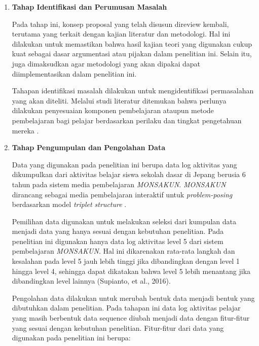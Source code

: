 \begin{enumerate}
    \item \textbf{Tahap Identifikasi dan Perumusan Masalah}

        \setlength{\parindent}{1cm}

        Pada tahap ini, konsep proposal yang telah disusun direview kembali, terutama yang terkait dengan kajian literatur dan metodologi. Hal ini dilakukan untuk memastikan bahwa hasil kajian teori yang digunakan cukup kuat sebagai dasar argumentasi atau pijakan dalam penelitian ini. Selain itu, juga dimaksudkan agar metodologi yang akan dipakai dapat diimplementasikan dalam penelitian ini.

        Tahapan identifikasi masalah dilakukan untuk mengidentifikasi permasalahan yang akan diteliti. Melalui studi literatur ditemukan bahwa perlunya dilakukan penyesuaian komponen pembelajaran ataupun metode pembelajaran bagi pelajar berdasarkan perilaku dan tingkat pengetahuan mereka \citep{Ahmad2015}. 

    \item \textbf{Tahap Pengumpulan dan Pengolahan Data}

        Data yang digunakan pada penelitian ini berupa data log aktivitas yang dikumpulkan dari aktivitas belajar siswa sekolah dasar di Jepang berusia 6 tahun pada sistem media pembelajaran \textit{MONSAKUN}. \textit{MONSAKUN} dirancang sebagai media pembelajaran interaktif untuk \textit{problem-posing} berdasarkan model \textit{triplet structure} \citep{Hirashima2014}. 

        Pemilihan data digunakan untuk melakukan seleksi dari kumpulan data menjadi data yang hanya sesuai dengan kebutuhan penelitian. Pada penelitian ini digunakan hanya data log aktivitas level 5 dari sistem pembelajaran \textit{MONSAKUN}. Hal ini dikarenakan rata-rata langkah dan kesalahan pada level 5 jauh lebih tinggi jika dibandingkan dengan level 1 hingga level 4, sehingga dapat dikatakan bahwa level 5 lebih menantang jika dibandingkan level lainnya (Supianto, et al., 2016).

        Pengolahan data dilakukan untuk merubah bentuk data menjadi bentuk yang dibutuhkan dalam penelitian. Pada tahapan ini data log aktivitas pelajar yang masih berbentuk data sequence diubah menjadi data dengan fitur-fitur yang sesuai dengan kebutuhan penelitian. Fitur-fitur dari data yang digunakan pada penelitian ini berupa:


\end{enumerate}
